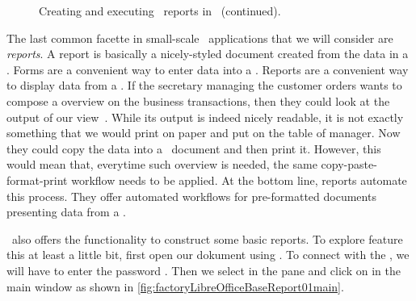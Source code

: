 %
%
\begin{figure}%
\ContinuedFloat%
\centering%
%
%
%
\floatSep%
%
%
%
\floatRowSep%
%
%
%
\caption{Creating and executing \db\ reports in \libreofficeBase~(continued).}%
\label{fig:factoryLibreOfficeBaseReportE}%
\end{figure}%
%
%
The last common facette in small-scale \db\ applications that we will consider are \emph{reports}.
A report is basically a nicely-styled document created from the data in a \db.
Forms are a convenient way to enter data into a \db.
Reports are a convenient way to display data from a \db.
If the secretary managing the customer orders wants to compose a overview on the business transactions, then they could look at the output of our view~.
While its output is indeed nicely readable, it is not exactly something that we would print on paper and put on the table of manager.
Now they could copy the data into a \microsoftWord\ document and then print it.
However, this would mean that, everytime such overview is needed, the same copy-paste-format-print workflow needs to be applied.
At the bottom line, reports automate this process.
They offer automated workflows for pre-formatted documents presenting data from a \db.

\libreofficeBase\ also offers the functionality to construct some basic reports.
To explore feature this at least a little bit, first open our dokument  using \libreofficeBase.
To connect with the \db, we will have to enter the password .
Then we select  in the  pane and click on  in the \libreofficeBase main window as shown in \cref{fig:factoryLibreOfficeBaseReport01main}.

